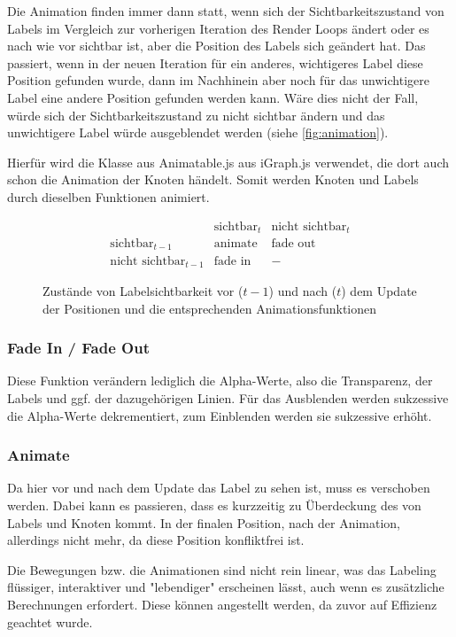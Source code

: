 Die Animation finden immer dann statt, wenn sich der Sichtbarkeitszustand von Labels im Vergleich zur vorherigen Iteration des Render Loops ändert
oder es nach wie vor sichtbar ist, aber die Position des Labels sich geändert hat.
Das passiert, wenn in der neuen Iteration für ein anderes, wichtigeres Label diese Position gefunden wurde, dann im Nachhinein aber noch für das unwichtigere Label eine andere Position gefunden werden kann.
Wäre dies nicht der Fall, würde sich der Sichtbarkeitszustand zu nicht sichtbar ändern und das unwichtigere Label würde ausgeblendet werden (siehe \autoref{fig:animation}).

Hierfür wird die Klasse aus {Animatable.js} aus {iGraph.js} verwendet, die dort auch schon die Animation der Knoten händelt.
Somit werden Knoten und Labels durch dieselben Funktionen animiert.

\begin{figure}[H]
    \centering

   $$ \begin{array}{c|c|c}
                        & \text{sichtbar}_t & \text{nicht sichtbar}_t\\ \hline
         \text{sichtbar}_{t-1}   & \text{animate}   & \text{fade out} \\ \hline
        \text{nicht sichtbar}_{t-1} & \text{fade in}    & -
    \end{array}$$
    \caption{Zustände von Labelsichtbarkeit vor ($t-1$) und nach ($t$) dem Update der Positionen und die entsprechenden Animationsfunktionen}
    \label{fig:animation}
\end{figure}

\subsubsection{Fade In / Fade Out}
Diese Funktion verändern lediglich die Alpha-Werte, also die Transparenz, der Labels und ggf. der dazugehörigen Linien.
Für das Ausblenden werden sukzessive die Alpha-Werte dekrementiert, zum Einblenden werden sie sukzessive erhöht.

\subsubsection{Animate}
Da hier vor und nach dem Update das Label zu sehen ist, muss es verschoben werden.
Dabei kann es passieren, dass es kurzzeitig zu Überdeckung des von Labels und Knoten kommt.
In der finalen Position, nach der Animation, allerdings nicht mehr, da diese Position konfliktfrei ist.

Die Bewegungen bzw. die Animationen sind nicht rein linear, was das Labeling flüssiger, interaktiver und "lebendiger" erscheinen lässt, auch wenn es zusätzliche Berechnungen erfordert.
Diese können angestellt werden, da zuvor auf Effizienz geachtet wurde.
